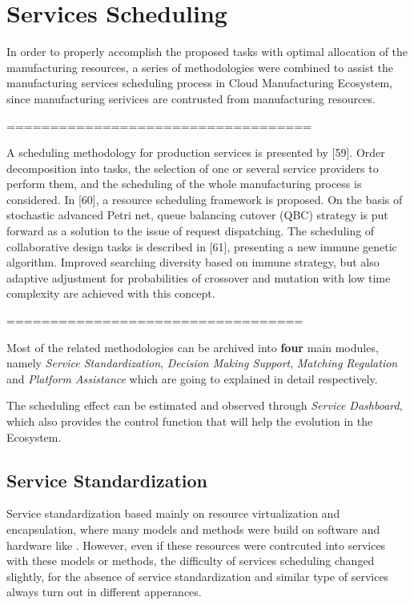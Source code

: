 \section{Services Scheduling} %
\label{sec:schedule}

In order to properly accomplish the proposed tasks with optimal allocation of the manufacturing resources, a series of methodologies were combined to assist the manufacturing services scheduling process in Cloud Manufacturing Ecosystem, since manufacturing serivices are contrusted from manufacturing resources. 

===================================

A scheduling methodology for production services is presented
by [59]. Order decomposition into tasks, the selection of one or several
service providers to perform them, and the scheduling of the whole
manufacturing process is considered. In [60], a resource scheduling
framework is proposed. On the basis of stochastic advanced Petri net,
queue balancing cutover (QBC) strategy is put forward as a solution to
the issue of request dispatching. The scheduling of collaborative
design tasks is described in [61], presenting a new immune genetic
algorithm. Improved searching diversity based on immune strategy, but
also adaptive adjustment for probabilities of crossover and mutation
with low time complexity are achieved with this concept.

==================================

Most of the related methodologies can be archived into \textbf{four} main modules, namely \textit{Service Standardization}, \textit{Decision Making Support}, \textit{Matching Regulation} and \textit{Platform Assistance} which are going to explained in detail respectively.

The scheduling effect can be estimated and observed through \textit{Service Dashboard}, which also provides the control function that will help the evolution in the Ecosystem.

\subsection{Service Standardization} %
\label{sub:service_standardization}
Service standardization based mainly on  resource virtualization and encapsulation, where many models and methods were build on software and hardware like \cite{Li2011,Wu2011,Li2011a,Liu2011}. However, even if these resources were contrcuted into services with these models or methods, the difficulty of services scheduling changed slightly, for the absence of service standardization and similar type of services always turn out in different apperances.

